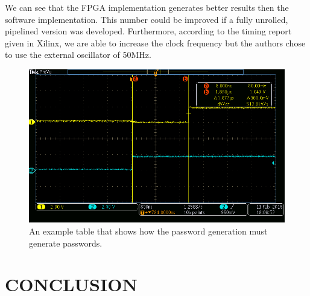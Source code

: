 \documentclass[letterpaper, 10 pt, conference]{ieeeconf}  %
\begin{document}
We can see that the FPGA implementation generates better results then the software implementation.  This number could be improved if a fully unrolled, pipelined version was developed.  Furthermore, according to the timing report given in Xilinx, we are able to increase the clock frequency but the authors chose to use the external oscillator of 50MHz.

\begin{figure}[thpb]
	\centering
	\includegraphics[scale=.40]{tek00001}
    \caption{An example table that shows how the password generation must generate passwords.}
\end{figure} 

 



\section{CONCLUSION}
  
\end{document}
